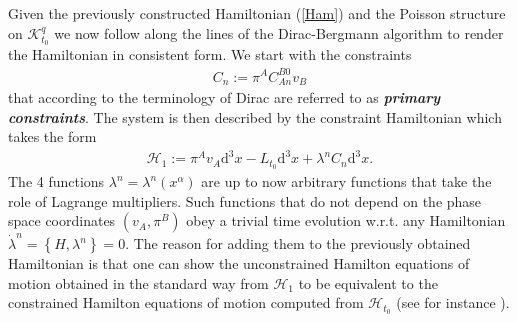 \documentclass[a4paper,12pt, DIV=14, BCOR=5mm, twoside, headsepline]{scrbook}
\begin{document}
Given the previously constructed Hamiltonian (\ref{Ham}) and the Poisson structure on $\mathcal{K}^q_{t_0}$ we now follow along the lines of the Dirac-Bergmann algorithm to render the Hamiltonian in consistent form. We start with the constraints 
\begin{align}
C_n := \pi^A C_{An}^{B0}v_B
\end{align}
that according to the terminology of Dirac are referred to as \textbf{\textit{primary constraints}}. The system is then described by the constraint Hamiltonian which takes the form 
\begin{align}
\mathcal{H}_1 := \pi^A v_A \mathrm{d}^3x -L_{t_0}\mathrm{d}^3x + \lambda^n C_n\mathrm{d}^3x.
\end{align}
The 4 functions $\lambda^n = \lambda^n(x^{\alpha})$ are up to now arbitrary functions that take the role of Lagrange multipliers. Such functions that do not depend on the phase space coordinates $(v_A, \pi^B)$ obey a trivial time evolution w.r.t. any Hamiltonian $\dot{\lambda}^n = \left \{H, \lambda^n \right \} = 0$. The reason for adding them to the previously obtained Hamiltonian is that one can show the unconstrained Hamilton equations of motion obtained in the standard way from $\mathcal{H}_1$ to be equivalent to the constrained Hamilton equations of motion computed from $\mathcal{H}_{t_0}$ (see for instance \cite{bojowald_2010}).
\end{document}
